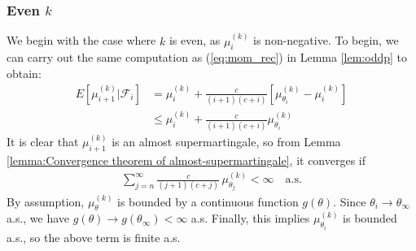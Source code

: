 \documentclass[11pt,a4paper]{article}
\theoremstyle{plain}
\theoremstyle{remark}
\theoremstyle{remark}
\begin{document}
    \subsubsection{Even $k$}
    We begin with the case where $k$ is even, as $\mu_i^{(k)}$ is non-negative. To begin, we can carry out the same computation as (\ref{eq:mom_rec}) in  Lemma \ref{lem:oddp} to obtain:
    \begin{align*}
        E\left[\mu_{i+1}^{(k)}\Big|\mathcal{F}_{i}\right] &= \mu_i^{(k)} + \frac{c}{(i+1)(c+i)}\left[\mu_{\theta_i}^{(k)} - \mu_i^{(k)}\right]\\
        &\leq \mu_i^{(k)} + \frac{c}{(i+1)(c+i)}\mu_{\theta_i}^{(k)} 
    \end{align*}
It is clear that $\mu_{i+1}^{(k)}$ is an almost supermartingale, so from Lemma \ref{lemma:Convergence theorem of almost-supermartingale}, it converges if
\begin{align*}
    \sum_{j = n}^\infty \frac{c}{(j+1)(c+j)} \, \mu_{\theta_j}^{(k)} < \infty \quad \text{a.s.}
\end{align*}
By assumption, $\mu_{\theta}^{(k)}$ is bounded by a continuous function $g(\theta)$. Since $\theta_i \to \theta_\infty$ a.s., we have  $g(\theta) \to g(\theta_\infty) < \infty$ a.s. 
Finally, this implies $\mu_{\theta_i}^{(k)}$ is bounded a.s., so the above term is finite a.s.
\end{document}
